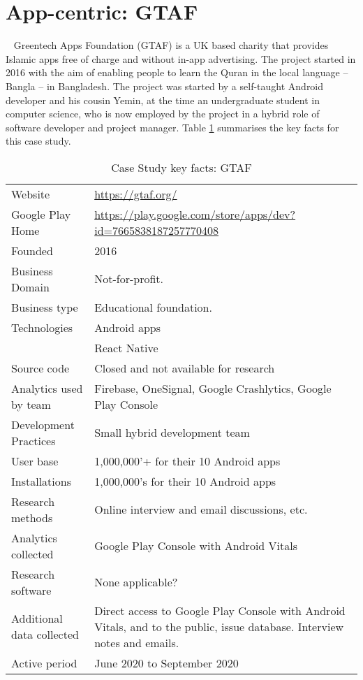 \section{App-centric: GTAF}~\label{case-study-overview-gtaf}
Greentech Apps Foundation (GTAF) is a UK based charity that provides Islamic apps free of charge and without in-app advertising. The project started in 2016 with the aim of enabling people to learn the Quran in the local language -- Bangla -- in Bangladesh. The project was started by a self-taught Android developer and his cousin Yemin, at the time an undergraduate student in computer science, who is now employed by the project in a hybrid role of software developer and project manager. Table \ref{tab:gtaf_anaytics_overview} summarises the key facts for this case study.

{\renewcommand{\arraystretch}{0.8}%
\begin{table}[htbp!]
    \centering
    \small
    \setlength{\tabcolsep}{6pt}
    \begin{tabular}{lp{11cm}}
       \toprule
       Website &\url{https://gtaf.org/} \\
       Google Play Home & \url{https://play.google.com/store/apps/dev?id=7665838187257770408} \\
       Founded & 2016 \\
       Business Domain & Not-for-profit.  \\
       Business type & Educational foundation. \\
       Technologies  & Android apps\footnotemark \\
       & React Native \\
       Source code  & Closed and not available for research \\
       Analytics used by team & Firebase, OneSignal, Google Crashlytics, Google Play Console \\
       Development Practices & Small hybrid development team \\
       \midrule
       User base & 1,000,000'+ for their 10 Android apps \\
       Installations & 1,000,000's for their 10 Android apps \\
       \midrule
       Research methods &Online interview and email discussions, etc. \\
       Analytics collected &Google Play Console with Android Vitals \\
       Research software & None applicable? \\
       Additional data collected &Direct access to Google Play Console with Android Vitals, and to the public, issue database. Interview notes and emails. \\
       Active period & June 2020 to September 2020 \\
       \bottomrule
    \end{tabular}
    \caption{Case Study key facts: GTAF}
    \label{tab:gtaf_anaytics_overview}
\end{table}
}

